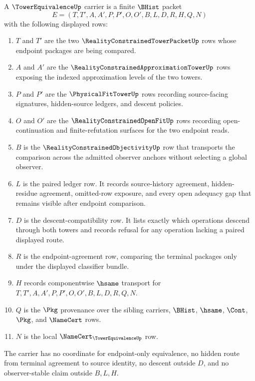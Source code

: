 \begin{definition}
\label{def:tower-equivalence-carrier}
A $\TowerEquivalenceUp$ carrier is a finite $\BHist$ packet
$$
E=(T,T',A,A',P,P',O,O',B,L,D,R,H,Q,N)
$$
with the following displayed rows:
\begin{enumerate}
\item $T$ and $T'$ are the two $\RealityConstrainedTowerPacketUp$ rows whose endpoint packages are being compared.
\item $A$ and $A'$ are the $\RealityConstrainedApproximationTowerUp$ rows exposing the indexed approximation levels of the two towers.
\item $P$ and $P'$ are the $\PhysicalFitTowerUp$ rows recording source-facing signatures, hidden-source ledgers, and descent policies.
\item $O$ and $O'$ are the $\RealityConstrainedOpenFitUp$ rows recording open-continuation and finite-refutation surfaces for the two endpoint reads.
\item $B$ is the $\RealityConstrainedObjectivityUp$ row that transports the comparison across the admitted observer anchors without selecting a global observer.
\item $L$ is the paired ledger row. It records source-history agreement, hidden-residue agreement, omitted-row exposure, and every open adequacy gap that remains visible after endpoint comparison.
\item $D$ is the descent-compatibility row. It lists exactly which operations descend through both towers and records refusal for any operation lacking a paired displayed route.
\item $R$ is the endpoint-agreement row, comparing the terminal packages only under the displayed classifier bundle.
\item $H$ records componentwise $\hsame$ transport for $T,T',A,A',P,P',O,O',B,L,D,R,Q,N$.
\item $Q$ is the $\Pkg$ provenance over the sibling carriers, $\BHist$, $\hsame$, $\Cont$, $\Pkg$, and $\NameCert$ rows.
\item $N$ is the local $\NameCert_{\TowerEquivalenceUp}$ row.
\end{enumerate}
The carrier has no coordinate for endpoint-only equivalence, no hidden route from terminal agreement to source identity, no descent outside $D$, and no observer-stable claim outside $B,L,H$.
\end{definition}

